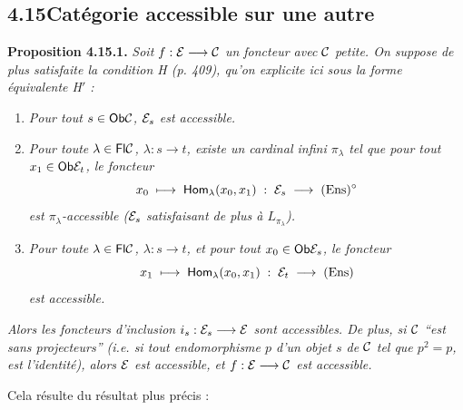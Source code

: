 \subsection*{4.15\quad Catégorie accessible sur une autre}

\textbf{Proposition 4.15.1.} \textit{Soit $f : \mathcal{E} \longrightarrow \mathcal{C}$ un foncteur avec $\mathcal{C}$ petite. On suppose de plus satisfaite la condition H (p. 409), qu'on explicite ici sous la forme équivalente H$'$ :}
\begin{enumerate}
\item[\textit{H 1)}] \textit{Pour tout $s \in \mathsf{Ob}\mathcal{C}$, $\mathcal{E}_s$ est accessible.}
\item[\textit{H 2)}] \textit{Pour toute $\lambda \in \mathsf{Fl}\mathcal{C}$, $\lambda : s \longrightarrow t$, existe un cardinal infini $\pi_\lambda$ tel que pour tout $x_1 \in \mathsf{Ob}\mathcal{E}_t$, le foncteur}
\[
x_0 \;\longmapsto\; \mathsf{Hom}_\lambda(x_0,x_1) \;:\; \mathcal{E}_s \;\longrightarrow\; (\mathrm{Ens})^\circ
\]
\textit{est $\pi_\lambda$-accessible ($\mathcal{E}_s$ satisfaisant de plus à $L_{\pi_\lambda}$).}
\item[\textit{H 3)}] \textit{Pour toute $\lambda \in \mathsf{Fl}\mathcal{C}$, $\lambda : s \longrightarrow t$, et pour tout $x_0 \in \mathsf{Ob}\mathcal{E}_s$, le foncteur}
\[
x_1 \;\longmapsto\; \mathsf{Hom}_\lambda(x_0,x_1) \;:\; \mathcal{E}_t \;\longrightarrow\; (\mathrm{Ens})
\]
\textit{est accessible.}
\end{enumerate}
\textit{Alors les foncteurs d'inclusion $i_s : \mathcal{E}_s \longrightarrow \mathcal{E}$ sont accessibles. De plus, si $\mathcal{C}$ ``est sans projecteurs'' (i.e. si tout endomorphisme $p$ d'un objet $s$ de $\mathcal{C}$ tel que $p^2 = p$, est l'identité), alors $\mathcal{E}$ est accessible, et $f : \mathcal{E} \longrightarrow \mathcal{C}$ est accessible.}

Cela résulte du résultat plus précis :


